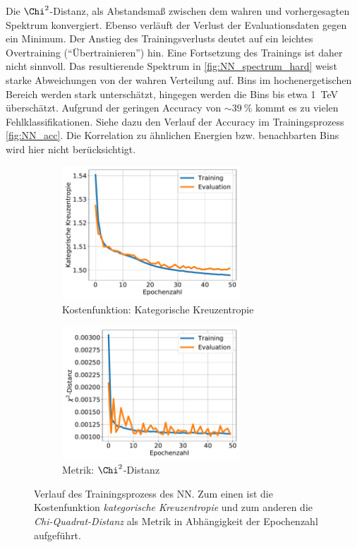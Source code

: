 Die $\Chi^2$-Distanz, als Abstandsmaß zwischen dem wahren und vorhergesagten Spektrum konvergiert.
Ebenso verläuft der Verlust der Evaluationsdaten gegen ein Minimum.
Der Anstieg des Trainingsverlusts deutet auf ein leichtes Overtraining ("`Übertrainieren"') hin.
Eine Fortsetzung des Trainings ist daher nicht sinnvoll.
Das resultierende Spektrum in \autoref{fig:NN_spectrum_hard} weist starke Abweichungen von der wahren Verteilung auf.
Bins im hochenergetischen Bereich werden stark unterschätzt, hingegen werden die Bins bis etwa \SI{1}{\tera\eV} überschätzt.
Aufgrund der geringen Accuracy von $\sim\SI{39}{\percent}$ kommt es zu vielen Fehlklassifikationen.
Siehe dazu den Verlauf der Accuracy im Trainingsprozess \autoref{fig:NN_acc}.
Die Korrelation zu ähnlichen Energien bzw. benachbarten Bins wird hier nicht berücksichtigt.
\begin{figure}%
    \begin{subfigure}{0.5\textwidth}%
        \centering%
        \includegraphics[height=5cm]{Plots/NN/loss.pdf}%
        \caption{Kostenfunktion: Kategorische Kreuzentropie}%
        \label{fig:NN_loss}%
    \end{subfigure}%
    \hfill%
    \begin{subfigure}{0.5\textwidth}%
        \centering%
        \includegraphics[height=5cm]{Plots/NN/chi.pdf}%
        \caption{Metrik: $\Chi^2$-Distanz}%
        \label{fig:NN_chi}%
    \end{subfigure}%
    \caption[Verlauf des Trainingsprozesses des NN ohne DSEA]{Verlauf des Trainingsprozess des NN.
    Zum einen ist die Kostenfunktion \textit{kategorische Kreuzentropie} und zum anderen die \textit{Chi-Quadrat-Distanz} als Metrik in Abhängigkeit der Epochenzahl aufgeführt.
    }
    \label{fig:NN_history}%
\end{figure}%

